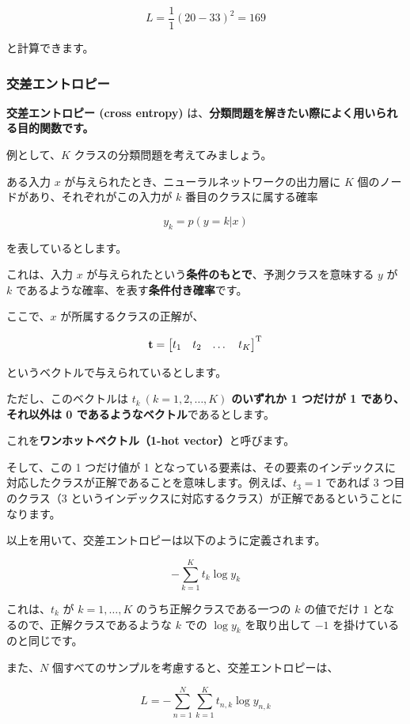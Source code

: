 \[
L = \frac{1}{1} (20 - 33)^2 = 169
\]


と計算できます。


\subsubsection{交差エントロピー}


\textbf{交差エントロピー (cross entropy)} は、\textbf{分類問題を解きたい際によく用いられる目的関数です。}

例として、$K$ クラスの分類問題を考えてみましょう。

ある入力 $x$ が与えられたとき、ニューラルネットワークの出力層に $K$ 個のノードがあり、それぞれがこの入力が $k$ 番目のクラスに属する確率


\[
y_k = p(y=k|x)
\]


を表しているとします。

これは、入力 $x$ が与えられたという\textbf{条件のもとで}、予測クラスを意味する $y$ が $k$ であるような確率、を表す\textbf{条件付き確率}です。


ここで、$x$ が所属するクラスの正解が、


\[
{\bf t} = \begin{bmatrix} t_1 & t_2 & \dots & t_K \end{bmatrix}^{\rm T}
\]


というベクトルで与えられているとします。

ただし、このベクトルは $t_k \ (k=1, 2, \dots, K)$ \textbf{のいずれか 1 つだけが 1 であり、それ以外は 0 であるようなベクトル}であるとします。

これを\textbf{ワンホットベクトル（1-hot vector）}と呼びます。

そして、この 1 つだけ値が 1 となっている要素は、その要素のインデックスに対応したクラスが正解であることを意味します。例えば、$t_3 = 1$ であれば 3 つ目のクラス（3 というインデックスに対応するクラス）が正解であるということになります。


以上を用いて、交差エントロピーは以下のように定義されます。


\[
- \sum_{k=1}^{K}t_{k}\log y_{k}
\]


これは、$t_k$ が $k = 1, \dots, K$ のうち正解クラスである一つの $k$ の値でだけ $1$ となるので、正解クラスであるような $k$ での $\log y_k$ を取り出して $-1$ を掛けているのと同じです。

また、$N$ 個すべてのサンプルを考慮すると、交差エントロピーは、


\[
L = - \sum_{n=1}^{N} \sum_{k=1}^{K}t_{n, k}\log y_{n, k}
\]



